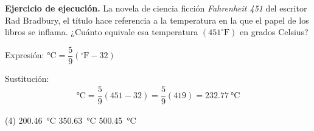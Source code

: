 \documentclass[12pt, letter]{exam}
\begin{document}
\begin{questions}
    \setcounter{question}{34} \question \label{Ejercicio_13} \textbf{Ejercicio de ejecución. } La novela de ciencia ficción \textit{Fahrenheit 451} del escritor Rad Bradbury, el título hace referencia a la temperatura en la que el papel de los libros se inflama. ¿Cuánto equivale esa temperatura $(451 ^{\circ}\text{F})$ en grados Celsius?

    Expresión: $\unit{\degreeCelsius} = \dfrac{5}{9} \left( ^{\circ}\text{F} - 32 \right)$

    Sustitución:
    \begin{align*}
        \unit{\degreeCelsius} = \dfrac{5}{9} \left( 451 - 32 \right) = \dfrac{5}{9} \left( 419\right) = \SI{232.77}{\degreeCelsius}
    \end{align*}
    \begin{tasks}(4)
        \task \SI{200.46}{\degreeCelsius}
        \task {}
        \task \SI{350.63}{\degreeCelsius}
        \task \SI{500.45}{\degreeCelsius}
    \end{tasks}

    

\end{questions}
\end{document}
